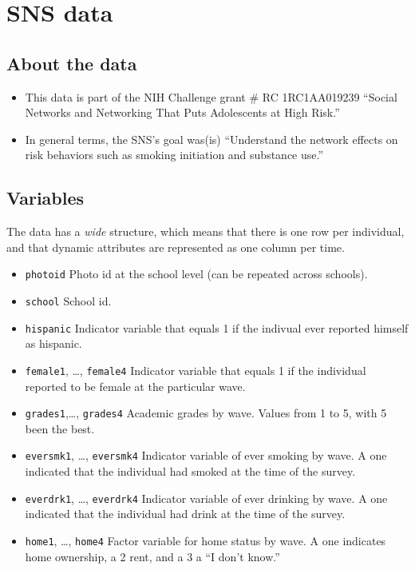 \documentclass[
]{book}
\begin{document}
\hypertarget{sns-data}{%
\section{SNS data}\label{sns-data}}

\hypertarget{about-the-data}{%
\subsection{About the data}\label{about-the-data}}

\begin{itemize}
\item
  This data is part of the NIH Challenge grant \# RC 1RC1AA019239 ``Social
  Networks and Networking That Puts Adolescents at High Risk.''
\item
  In general terms, the SNS's goal was(is) ``Understand the network effects on
  risk behaviors such as smoking initiation and substance use.''
\end{itemize}

\hypertarget{variables}{%
\subsection{Variables}\label{variables}}

The data has a \emph{wide} structure, which means that there is one row per individual,
and that dynamic attributes are represented as one column per time.

\begin{itemize}
\item
  \texttt{photoid} Photo id at the school level (can be repeated across schools).
\item
  \texttt{school} School id.
\item
  \texttt{hispanic} Indicator variable that equals 1 if the indivual ever reported
  himself as hispanic.
\item
  \texttt{female1}, \ldots, \texttt{female4} Indicator variable that equals 1 if the individual
  reported to be female at the particular wave.
\item
  \texttt{grades1},\ldots, \texttt{grades4} Academic grades by wave. Values from 1 to 5, with 5
  been the best.
\item
  \texttt{eversmk1}, \ldots, \texttt{eversmk4} Indicator variable of ever smoking by wave. A one
  indicated that the individual had smoked at the time of the survey.
\item
  \texttt{everdrk1}, \ldots, \texttt{everdrk4} Indicator variable of ever drinking by wave.
  A one indicated that the individual had drink at the time of the survey.
\item
  \texttt{home1}, \ldots, \texttt{home4} Factor variable for home status by wave. A one
  indicates home ownership, a 2 rent, and a 3 a ``I don't know.''
\end{itemize}
\end{document}
